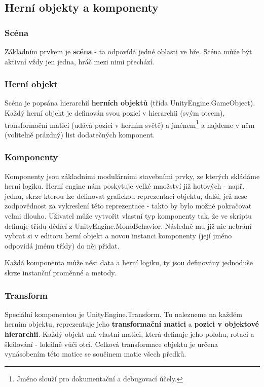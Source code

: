 \subsection{Herní objekty a komponenty}

\subsubsection*{Scéna}
Základním prvkem je \textbf{scéna} - ta odpovídá jedné oblasti ve hře. Scéna může být aktivní vždy jen jedna, hráč mezi nimi přechází.

\subsubsection*{Herní objekt}
Scéna je popsána hierarchií \textbf{herních objektů} (třída UnityEngine.GameObject). Každý herní objekt je definován svou pozicí v hierarchii (svým otcem), transformační maticí (udává pozici v herním světě) a jménem\footnote{Jméno slouží pro dokumentační a debugovací účely.} a najdeme v něm (volitelně prázdný) list dodatečných komponent.

\subsubsection*{Komponenty}
Komponenty jsou základními modulárními stavebními prvky, ze kterých skládáme herní logiku. Herní engine nám poskytuje velké množství již hotových - např. jednu, skrze kterou lze definovat grafickou reprezentaci objektu, další, jež nese zodpovědnost za vykreslení této reprezentace - takto by bylo možné pokračovat velmi dlouho. Uživatel může vytvořit vlastní typ komponenty tak, že ve skriptu definuje třídu dědící z UnityEngine.MonoBehavior. Následně mu již nic nebrání vybrat si v editoru herní objekt a novou instanci komponenty (její jméno odpovídá jménu třídy) do něj přidat.

Každá komponenta může nést data a herní logiku, ty jsou definovány jednoduše skrze instanční proměnné a metody.  

\subsubsection*{Transform}

Speciální komponentou je UnityEngine.Transform. Tu nalezneme na každém herním objektu, reprezentuje jeho \textbf{transformační matici} a \textbf{pozici v objektové hierarchii}. Každý objekt má vlastní matici, která definuje jeho polohu, rotaci a škálování - lokálně vůči otci. Celková transformace objektu je určena vynásobením této matice se součinem matic všech předků.

